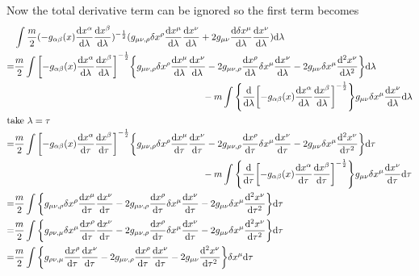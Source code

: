 \documentclass{article}
\begin{document}
Now the total derivative term can be ignored so the first term becomes
\begin{align*}
  &\int\frac{m}{2}(-g_{\alpha\beta}(x)\dv{x^{\alpha}}{\lambda}\dv{x^{\beta}}{\lambda})^{-\frac{1}{2}}(g_{\mu\nu,\rho}\delta x^{\rho}\dv{x^{\mu}}{\lambda}\dv{x^{\nu}}{\lambda}+2g_{\mu\nu}\dv{\delta x^{\mu}}{\lambda}\dv{x^{\nu}}{\lambda})\dd \lambda\\
  =&\frac{m}{2}\int\bqty{-g_{\alpha\beta}(x)\dv{x^{\alpha}}{\lambda}\dv{x^{\beta}}{\lambda}}^{-\frac{1}{2}}\Bqty{g_{\mu\nu,\rho}\delta x^{\rho}\dv{x^{\mu}}{\lambda}\dv{x^{\nu}}{\lambda}-2g_{\mu\nu,\rho}\dv{x^{\rho}}{\lambda}\delta{x^{\mu}}\dv{x^{\nu}}{\lambda}-2g_{\mu\nu}\delta x^{\mu}\dv[2]{x^{\nu}}{\lambda}}\dd\lambda\\
  &\qquad\qquad\qquad\qquad\qquad\qquad\qquad\qquad\qquad\qquad-m\int\Bqty{\dv{\lambda}\bqty{-g_{\alpha\beta}(x)\dv{x^{\alpha}}{\lambda}\dv{x^{\beta}}{\lambda}}^{-\frac{1}{2}}}g_{\mu\nu}\delta{x^{\mu}}\dv{x^{\nu}}{\lambda}\dd\lambda\\
  \intertext{take $\lambda=\tau$}
  =&\frac{m}{2}\int\bqty{-g_{\alpha\beta}(x)\dv{x^{\alpha}}{\tau}\dv{x^{\beta}}{\tau}}^{-\frac{1}{2}}\Bqty{g_{\mu\nu,\rho}\delta x^{\rho}\dv{x^{\mu}}{\tau}\dv{x^{\nu}}{\tau}-2g_{\mu\nu,\rho}\dv{x^{\rho}}{\tau}\delta{x^{\mu}}\dv{x^{\nu}}{\tau}-2g_{\mu\nu}\delta x^{\mu}\dv[2]{x^{\nu}}{\tau}}\dd\tau\\
  &\qquad\qquad\qquad\qquad\qquad\qquad\qquad\qquad\qquad\qquad-m\int\Bqty{\dv{\tau}\bqty{-g_{\alpha\beta}(x)\dv{x^{\alpha}}{\tau}\dv{x^{\beta}}{\tau}}^{-\frac{1}{2}}}g_{\mu\nu}\delta{x^{\mu}}\dv{x^{\nu}}{\tau}\dd\tau\\
  =&\frac{m}{2}\int\Bqty{g_{\mu\nu,\rho}\delta x^{\rho}\dv{x^{\mu}}{\tau}\dv{x^{\nu}}{\tau}-2g_{\mu\nu,\rho}\dv{x^{\rho}}{\tau}\delta{x^{\mu}}\dv{x^{\nu}}{\tau}-2g_{\mu\nu}\delta x^{\mu}\dv[2]{x^{\nu}}{\tau}}\dd\tau\\
  =&\frac{m}{2}\int\Bqty{g_{\rho\nu,\mu}\delta x^{\mu}\dv{x^{\rho}}{\tau}\dv{x^{\nu}}{\tau}-2g_{\mu\nu,\rho}\dv{x^{\rho}}{\tau}\delta{x^{\mu}}\dv{x^{\nu}}{\tau}-2g_{\mu\nu}\delta x^{\mu}\dv[2]{x^{\nu}}{\tau}}\dd\tau\\
  =&\frac{m}{2}\int\Bqty{g_{\rho\nu,\mu}\dv{x^{\rho}}{\tau}\dv{x^{\nu}}{\tau}-2g_{\mu\nu,\rho}\dv{x^{\rho}}{\tau}\dv{x^{\nu}}{\tau}-2g_{\mu\nu}\dv[2]{x^{\nu}}{\tau}}\delta{x^{\mu}}\dd\tau
\end{align*}
\end{document}
